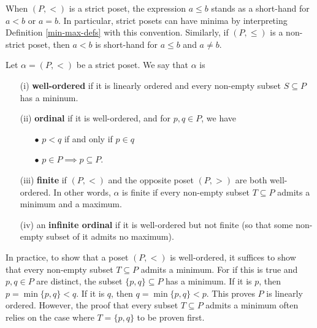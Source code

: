 \begin{remark}
    When $(P,<)$ is a strict poset, the expression $a \le b$ stands as a short-hand for $a < b$ or $a=b$. In particular, strict posets can have minima by interpreting Definition \autoref{min-max-defs} with this convention. Similarly, if $(P, \le)$ is a non-strict poset, then $a < b$ is short-hand for $a \le b$ and $a \neq b$. 
\end{remark}

\begin{definition} \label{well-ordered-sets}
    Let $\alpha = (P,<)$ be a strict poset. We say that $\alpha$ is 
    \\

    \begin{itemize}
        \item[(i)] \textbf{well-ordered} if it is linearly ordered and every non-empty subset $S \subseteq P$ has a mininum.
        \\

        \item[(ii)] \textbf{ordinal} if it is well-ordered, and for $p,q \in P$, we have
        \\

            \begin{itemize}
                \item[$\bullet$] $p < q$ if and only if $p \in q$
                \\

                \item[$\bullet$] $p \in P \implies p \subseteq P$.
                \\
            \end{itemize}

        \item[(iii)] \textbf{finite} if $(P, <)$ and the opposite poset $(P, >)$ are both well-ordered. In other words, $\alpha$ is finite if every non-empty subset $T \subseteq P$ admits a minimum and a maximum.
        \\

        \item[(iv)] an \textbf{infinite ordinal} if it is well-ordered but not finite (so that some non-empty subset of it admits no maximum).
    \end{itemize}
\end{definition}

\begin{remark}
    In practice, to show that a poset $(P,<)$ is well-ordered, it suffices to show that every non-empty subset $T \subseteq P$ admits a minimum. For if this is true and $p,q \in P$ are distinct, the subset $\{p,q\} \subseteq P$ has a minimum. If it is $p$, then $p = \min\{p,q\} < q$. If it is $q$, then $q = \min\{p,q\} < p$. This proves $P$ is linearly ordered. However, the proof that every subset $T \subseteq P$ admits a minimum often relies on the case where $T = \{p,q\}$ to be proven first.
\end{remark}

